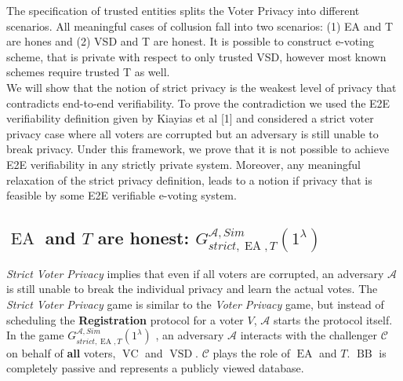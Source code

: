 \documentclass[12pt]{article}
\DeclareMathOperator{\vsd}{VSD}
\DeclareMathOperator{\ea}{EA}
\DeclareMathOperator{\bb}{BB}
\DeclareMathOperator{\voc}{VC}
\begin{document}
 The specification of trusted entities splits the Voter Privacy into different scenarios. All meaningful cases of collusion fall into two scenarios: (1) EA and T are hones and (2) VSD and T are honest. It is possible to construct e-voting scheme, that is private with respect to only trusted VSD, however most known schemes require trusted T as well. \\
 
We will show that the notion of strict privacy is the weakest level of privacy that contradicts end-to-end verifiability. To prove the contradiction we used the E2E verifiability definition given by Kiayias et al [1] and considered a strict voter privacy case where all voters are corrupted but an adversary is still unable to break privacy. Under this framework, we prove that it is not possible to achieve E2E verifiability in any strictly private system. Moreover, any meaningful relaxation of the strict privacy definition, leads to a notion if privacy that is feasible by some E2E verifiable e-voting system.

\subsection{$\ea$ and $T$ are honest: $G_{strict,\ea,T}^{\mathcal{A}, Sim}(1^{\lambda})$}
\textit{Strict Voter Privacy} implies that even if all voters are corrupted,   an adversary $\mathcal{A}$ is still unable to break the individual privacy and learn the actual votes. The \textit{Strict Voter Privacy}  game is similar to the \textit{Voter Privacy} game, but instead of scheduling the \textbf{Registration} protocol for a voter $V$,  $\mathcal{A}$ starts the protocol itself. \\

In the game  $G_{strict,\ea,T}^{\mathcal{A}, Sim}(1^{\lambda})$ , an adversary $\mathcal{A}$ interacts with the challenger $\mathcal{C}$ on behalf of \textbf{all} voters, $\voc$ and $\vsd$. $\mathcal{C}$ plays the role of $\ea$ and $T$. $\bb$ is completely passive and represents a publicly viewed database. \\
\end{document}
